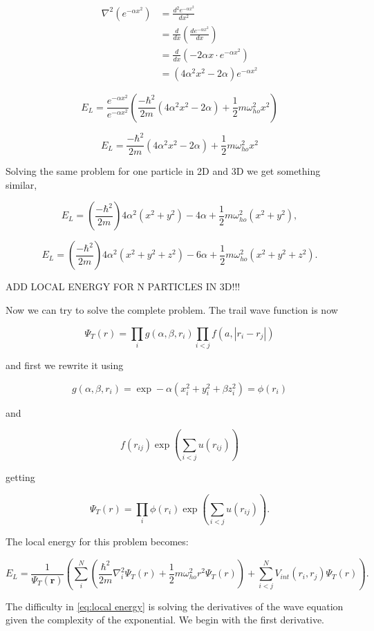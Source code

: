 \documentclass[a4paper,10pt,twoside]{report}
\begin{document}
\begin{align*}
\nabla^2(e^{-\alpha x^2}) &= \frac{d^2 e^{-\alpha x^2}}{dx^2}\\
&= \frac{d}{dx} \left(\frac{de^{-\alpha x^2}}{dx}\right)\\
&= \frac{d}{dx} (-2\alpha x \cdot e^{-\alpha x^2})\\
&= (4\alpha^2 x^2 - 2\alpha)e^{-\alpha x^2} 
\end{align*}

$$E_L = \frac{e^{-\alpha x^2}}{e^{-\alpha x^2}}\left( \frac{-\hbar^2}{2m}  (4\alpha^2 x^2 - 2\alpha) + \frac{1}{2} m\omega_{ho}^2 x^2\right)$$

$$E_L = \frac{-\hbar^2}{2m}(4\alpha^2 x^2 - 2\alpha) + \frac{1}{2} m\omega_{ho}^2 x^2$$

Solving the same problem for one particle in 2D and 3D we get something similar, 

$$E_L = (\frac{-\hbar^2}{2m})4\alpha^2 (x^2 + y^2) - 4\alpha + \frac{1}{2} m\omega_{ho}^2 (x^2 + y^2),$$

$$E_L = (\frac{-\hbar^2}{2m})4\alpha^2 (x^2 + y^2 + z^2) - 6\alpha + \frac{1}{2} m\omega_{ho}^2 (x^2 + y^2 + z^2).$$

ADD LOCAL ENERGY FOR N PARTICLES IN 3D!!!

Now we can try to solve the complete problem. The trail wave function is now

$$\Psi_T(r) = \prod_{i} g(\alpha, \beta, r_i) \prod_{i<j} f(a, |r_i - r_j|)$$

and first we rewrite it using 

$$g(\alpha, \beta, r_i) = \exp -\alpha (x_i^2 + y_i^2 + \beta z_i^2) = \phi (r_i)$$

and 

$$f(r_{ij})\exp \left(\sum_{i<j}u(r_{ij})\right)$$

getting 

$$\Psi_T(r) = \prod_{i} \phi (r_i) \exp \left(\sum_{i<j}u(r_{ij})\right).$$

The local energy for this problem becomes:


\begin{equation} \label{eq:local energy}
E_L = \frac{1}{\Psi_T(\boldsymbol{r})} \left( \sum_{i}^{N} \left(\frac{\hbar^2}{2m} \nabla_i^2 \Psi_T(r) + \frac{1}{2} m\omega_{ho}^2 r^2 \Psi_T(r) \right) + \sum_{i<j}^{N} V_{int}(r_i,r_j) \Psi_T(r) \right).
\end{equation}

The difficulty in \eqref{eq:local energy} is solving the derivatives of the wave equation given the complexity of the exponential. We begin with the first derivative.
\end{document}
